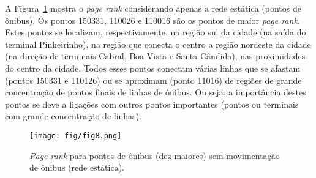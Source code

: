 A Figura~\ref{fig:pagerank} mostra o \emph{page rank} considerando apenas a rede estática (pontos de ônibus). Os pontos 150331, 110026 e 110016 são os pontos de maior \emph{page rank}. Estes pontos se localizam, respectivamente, na região sul da cidade (na saída do terminal Pinheirinho), na região que conecta o centro a região nordeste da cidade (na direção de terminais Cabral, Boa Vista e Santa Cândida), nas proximidades do centro da cidade. Todos esses pontos conectam várias linhas que se afastam (pontos 150331 e 110126) ou se aproximam (ponto 11016) de regiões de grande concentração de pontos finais de linhas de ônibus. Ou seja, a importância destes pontos se deve a ligações com outros pontos importantes (pontos ou terminais com grande concentração de linhas).



\begin{figure}
\centering
\texttt{[image: fig/fig8.png]}
\caption{\emph{Page rank} para pontos de ônibus (dez maiores) sem movimentação de ônibus (rede estática).}
\label{fig:pagerank}
\end{figure}



        
